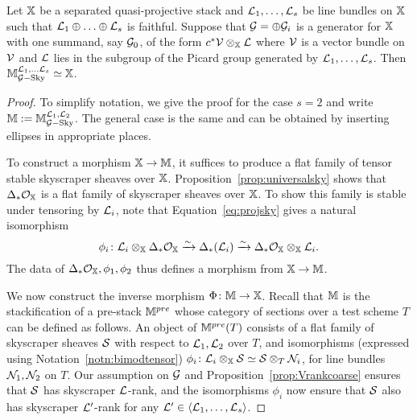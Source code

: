 \documentclass[12pt]{amsart}
\begin{document}
\begin{theorem}  \label{thm:tautological}
Let $\mathbb{X}$ be a separated quasi-projective stack and $\mathcal{L}_1,\ldots, \mathcal{L}_s$ be line bundles on $\mathbb{X}$ such that $\mathcal{L}_1 \oplus \ldots \oplus \mathcal{L}_s$ is faithful. Suppose that $\mathcal{G} = \oplus \mathcal{G}_i$ is a generator for $\mathbb{X}$ with one summand, say $\mathcal{G}_0$, of the form $c^* \mathcal{V} \otimes_{\mathbb{X}} \mathcal{L}$ where $\mathcal{V}$ is a vector bundle on $\mathcal{V}$ and $\mathcal{L}$ lies in the subgroup of the Picard group generated by $\mathcal{L}_1,\ldots, \mathcal{L}_s$. Then $\mathbb{M}^{\mathcal{L}_1,\ldots\mathcal{L}_s}_{\mathcal{G}-\textup{Sky}} \simeq \mathbb{X}$.
\end{theorem}
\begin{proof}
To simplify notation, we give the proof for the case $s=2$ and write $\mathbb{M}:=\mathbb{M}^{\mathcal{L}_1,\mathcal{L}_2}_{\mathcal{G}-\textup{Sky}}$. The general case is the same and can be obtained by inserting ellipses in appropriate places. 

To construct a morphism $\mathbb{X} \to \mathbb{M}$, it suffices to produce a flat family of tensor stable skyscraper sheaves over $\mathbb{X}$. Proposition~\ref{prop:universalsky} shows that $\Delta_* \mathcal{O}_{\mathbb{X}}$ is a flat family of skyscraper sheaves over $\mathbb{X}$. To show this family is stable under tensoring by $\mathcal{L}_i$, note that Equation~\ref{eq:projsky} gives a natural isomorphism
$$ \phi_i \colon \mathcal{L}_i \otimes_{\mathbb{X}} \Delta_* \mathcal{O}_{\mathbb{X}} \xrightarrow{\sim} \Delta_*(\mathcal{L}_i) \xrightarrow{\sim} \Delta_* \mathcal{O}_{\mathbb{X}} \otimes_{\mathbb{X}} \mathcal{L}_i .$$
The data of $\Delta_* \mathcal{O}_{\mathbb{X}}, \phi_1, \phi_2$ thus defines a morphism from $\mathbb{X} \to \mathbb{M}$. 

We now construct the inverse morphism $\Phi \colon \mathbb{M} \to \mathbb{X}$. Recall that $\mathbb{M}$ is the stackification of a pre-stack $\mathbb{M}^{pre}$ whose category of sections over a test scheme $T$ can be defined as follows. An object of $\mathbb{M}^{pre}(T)$ consists of a flat family of skyscraper sheaves $\mathcal{S}$ with respect to $\mathcal{L}_1,\mathcal{L}_2$ over $T$, and isomorphisms (expressed using Notation~\ref{notn:bimodtensor}) 
$\phi_i \colon \mathcal{L}_i \otimes_{\mathbb{X}} \mathcal{S} \simeq \mathcal{S} \otimes_T \mathcal{N}_i$, for line bundles $\mathcal{N}_1,\mathcal{N}_2$ on $T$. Our assumption on $\mathcal{G}$ and Proposition~\ref{prop:Vrankcoarse} ensures that $\mathcal{S}$ has skyscraper $\mathcal{L}$-rank, and the isomorphisms $\phi_i$ now ensure that $\mathcal{S}$ also has skyscraper $\mathcal{L}'$-rank for any $\mathcal{L}' \in \langle \mathcal{L}_1,\ldots, \mathcal{L}_s \rangle$. 


\end{proof}
\end{document}
